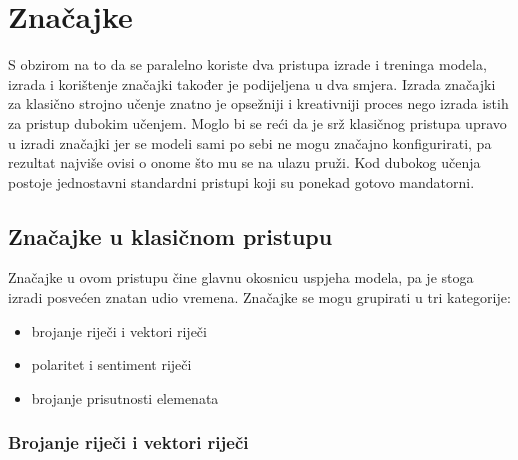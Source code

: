 \documentclass[times, utf8, zavrsni]{fer}
\begin{document}
\section{Značajke}

S obzirom na to da se paralelno koriste dva pristupa izrade i treninga modela, izrada i korištenje značajki također je podijeljena u dva smjera. Izrada značajki za klasično strojno učenje znatno je opsežniji i kreativniji proces nego izrada istih za pristup dubokim učenjem. Moglo bi se reći da je srž klasičnog pristupa upravo u izradi značajki jer se modeli sami po sebi ne mogu značajno konfigurirati, pa rezultat najviše ovisi o onome što mu se na ulazu pruži. Kod dubokog učenja postoje jednostavni standardni pristupi koji su ponekad gotovo mandatorni. 


\subsection{Značajke u klasičnom pristupu}

Značajke u ovom pristupu čine glavnu okosnicu uspjeha modela, pa je stoga izradi posvećen znatan udio vremena. Značajke se mogu grupirati u tri kategorije: \begin{itemize}
\item brojanje riječi i vektori riječi
\item polaritet i sentiment riječi
\item brojanje prisutnosti elemenata
\end{itemize}

\subsubsection{Brojanje riječi i vektori riječi}
\end{document}
